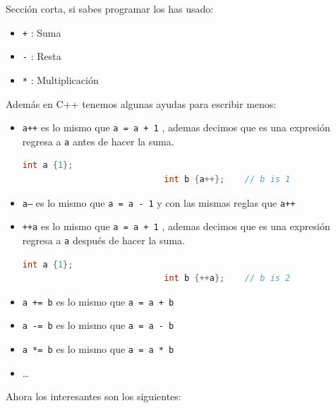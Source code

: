 \documentclass[12pt, fleqn]{report}                             %
\theoremstyle{break}                                            %
\newcommand{\textCode}[1]  { \texttt{#1} }                      %
\begin{document}
                Sección corta, si sabes programar los has usado:

                \begin{itemize}
                    \item \textCode{+}: Suma
                    \item \textCode{-}: Resta
                    \item \textCode{*}: Multiplicación
                \end{itemize}

                Además en C++ tenemos algunas ayudas para escribir menos:
                \begin{itemize}
                    \item \textCode{a++} es lo mismo que \textCode{a = a + 1}, ademas 
                        decimos que es una expresión regresa a \textCode{a} antes de hacer la suma.
                        \begin{lstlisting}[language=C++, gobble=28]
                            int a {1};
                            int b {a++};    // b is 1
                        \end{lstlisting}
                    \item \textCode{a---} es lo mismo que \textCode{a = a - 1} y con las mismas reglas que \textCode{a++}
                    \item \textCode{++a} es lo mismo que \textCode{a = a + 1}, ademas 
                        decimos que es una expresión regresa a \textCode{a} después de hacer la suma.
                        \begin{lstlisting}[language=C++, gobble=28]
                            int a {1};
                            int b {++a};    // b is 2
                        \end{lstlisting}
                    \item \textCode{a += b} es lo mismo que \textCode{a = a + b}
                    \item \textCode{a -= b} es lo mismo que \textCode{a = a - b}
                    \item \textCode{a *= b} es lo mismo que \textCode{a = a * b}
                    \item \dots
                \end{itemize}

                Ahora los interesantes son los siguientes:

\end{document}
